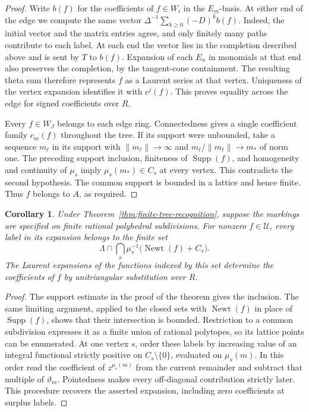 \documentclass[11pt,reqno]{amsart}
\numberwithin{equation}{section}
\newtheorem{corollary}[theorem]{Corollary}
\theoremstyle{definition}
\theoremstyle{remark}
\DeclareMathOperator{\Newt}{Newt}
\DeclareMathOperator{\Supp}{Supp}
\begin{document}
\begin{proof}
Write \(b(f)\) for the coefficients of \(f\in W_i\) in the \(E_m\)-basis.
At either end of the edge we compute the same vector
\(\Delta^{-1}\sum_{k\ge0}(-D)^k b(f)\). Indeed, the initial vector and the matrix entries agree, and only finitely
many paths contribute to each label. At each end the vector lies in the completion
described above and is sent by \(T\) to \(b(f)\). Expansion of each
\(E_n\) in monomials at that end also preserves the completion, by the
tangent-cone containment. The resulting theta sum therefore represents
\(f\) as a Laurent series at that vertex. Uniqueness of the vertex
expansion identifies it with \(c^j(f)\). This proves equality across
the edge for signed coefficients over \(R\).

Every \(f\in W_J\) belongs to each edge ring. Connectedness
gives a single coefficient family \(c_m(f)\) throughout the tree. If its
support were unbounded, take a sequence \(m_\ell\) in its support with
\(\|m_\ell\|\to\infty\) and \(m_\ell/\|m_\ell\|\to m_*\) of norm one.
The preceding support inclusion, finiteness of \(\Supp(f)\),
and homogeneity and continuity of \(\mu_s\) imply
\(\mu_s(m_*)\in C_s\) at every vertex. This contradicts the second
hypothesis. The common support is bounded in a lattice and hence finite.
Thus \(f\) belongs to \(A\), as required.
\end{proof}

\begin{corollary}\label{cor:finite-tree-expansion}
Under Theorem~\ref{thm:finite-tree-recognition}, suppose the markings
are specified on finite rational polyhedral subdivisions. For nonzero
\(f\in\mathcal U\), every label in its expansion belongs to the finite set
\[ \Lambda\cap\bigcap_s\mu_s^{-1}\bigl(\Newt (f)+C_s\bigr). \]
The Laurent expansions of the functions indexed by this set determine
the coefficients of \(f\) by unitriangular substitution over \(R\).
\end{corollary}
\begin{proof}
The support estimate in the proof of the theorem gives the inclusion.
The same limiting argument, applied to the closed sets with
\(\Newt (f)\) in place of \(\Supp(f)\),
shows that their intersection is bounded. Restriction to a common
subdivision expresses it as a finite union of rational polytopes, so
its lattice points can be enumerated. At one vertex \(s\), order these
labels by increasing value of an integral functional strictly positive
on \(C_s\setminus\{0\}\), evaluated on \(\mu_s(m)\). In this order
read the coefficient of \(z^{\mu_s(m)}\) from the current remainder
and subtract that multiple of \(\vartheta_m\). Pointedness makes
every off-diagonal contribution strictly later. This procedure recovers
the asserted expansion, including zero coefficients at surplus labels.
\end{proof}
\end{document}
